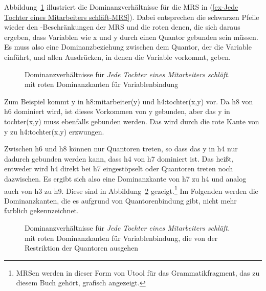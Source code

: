 Abbildung~\ref{fig-Jede Tochter eines Mitarbeiters schläft-MRS-Variable}
illustriert die Dominanzverhältnisse für die MRS in (\ref{ex-Jede Tochter eines Mitarbeiters
  schläft-MRS}). Dabei entsprechen die schwarzen Pfeile wieder den \qeq-Beschränkungen der MRS und die
roten denen, die sich daraus ergeben, dass Variablen wie x und y durch einen Quantor gebunden sein
müssen. Es muss also eine Dominanzbeziehung zwischen dem Quantor, der die Variable einführt, und
allen Ausdrücken, in denen die Variable vorkommt, geben.
\begin{figure}
\caption{Dominanzverhältnisse für \emph{Jede Tochter eines Mitarbeiters schläft.} mit roten
  Dominanzkanten für Variablenbindung}\label{fig-Jede Tochter eines Mitarbeiters schläft-MRS-Variable}
\end{figure}
Zum Beispiel kommt y in h8:mitarbeiter(y) und h4:tochter(x,y) vor. Da h8 von h6 dominiert wird, ist
dieses Vorkommen von y gebunden, aber das y in tochter(x,y) muss ebenfalls gebunden werden. Das wird
durch die rote Kante von y zu h4:tochter(x,y) erzwungen. 

Zwischen h6 und h8 können nur Quantoren treten, so dass das y in h4 nur dadurch gebunden werden
kann, dass h4 von h7 dominiert ist. Das heißt, entweder wird h4 direkt bei h7 eingestöpselt oder
Quantoren treten noch dazwischen. Es ergibt sich also eine Dominanzkante von h7 zu h4 und analog
auch von h3 zu h9. Diese sind in Abbildung~\ref{fig-Jede Tochter eines Mitarbeiters schläft-MRS}
gezeigt.\footnote{%
  MRSen werden in dieser Form von Utool \citep{KT2005a-u} für das Grammatikfragment, das zu diesem Buch gehört,
  grafisch angezeigt.
} Im Folgenden werden die Dominanzkanten, die es aufgrund von Quantorenbindung gibt, nicht mehr
farblich gekennzeichnet.
\begin{figure}
\caption{Dominanzverhältnisse für \emph{Jede Tochter eines Mitarbeiters schläft.} mit roten
  Dominanzkanten für Variablenbindung, die von der Restriktion der Quantoren ausgehen}\label{fig-Jede Tochter eines Mitarbeiters schläft-MRS}
\end{figure}

